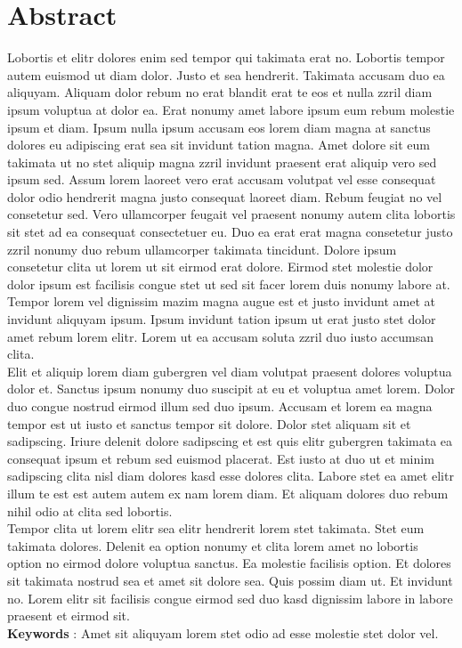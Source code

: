 \documentclass[a4paper,11pt]{article}
\begin{document}
%

%
\newpage
%
\section*{Abstract}
%
Lobortis et elitr dolores enim sed tempor qui takimata erat no. Lobortis tempor autem euismod ut diam dolor. Justo et sea hendrerit. Takimata accusam duo ea aliquyam. Aliquam dolor rebum no erat blandit erat te eos et nulla zzril diam ipsum voluptua at dolor ea. Erat nonumy amet labore ipsum eum rebum molestie ipsum et diam. Ipsum nulla ipsum accusam eos lorem diam magna at sanctus dolores eu adipiscing erat sea sit invidunt tation magna. Amet dolore sit eum takimata ut no stet aliquip magna zzril invidunt praesent erat aliquip vero sed ipsum sed. Assum lorem laoreet vero erat accusam volutpat vel esse consequat dolor odio hendrerit magna justo consequat laoreet diam. Rebum feugiat no vel consetetur sed. Vero ullamcorper feugait vel praesent nonumy autem clita lobortis sit stet ad ea consequat consectetuer eu. Duo ea erat erat magna consetetur justo zzril nonumy duo rebum ullamcorper takimata tincidunt. Dolore ipsum consetetur clita ut lorem ut sit eirmod erat dolore. Eirmod stet molestie dolor dolor ipsum est facilisis congue stet ut sed sit facer lorem duis nonumy labore at. Tempor lorem vel dignissim mazim magna augue est et justo invidunt amet at invidunt aliquyam ipsum. Ipsum invidunt tation ipsum ut erat justo stet dolor amet rebum lorem elitr. Lorem ut ea accusam soluta zzril duo iusto accumsan clita. \\
%
\noindent
Elit et aliquip lorem diam gubergren vel diam volutpat praesent dolores voluptua dolor et. Sanctus ipsum nonumy duo suscipit at eu et voluptua amet lorem. Dolor duo congue nostrud eirmod illum sed duo ipsum. Accusam et lorem ea magna tempor est ut iusto et sanctus tempor sit dolore. Dolor stet aliquam sit et sadipscing. Iriure delenit dolore sadipscing et est quis elitr gubergren takimata ea consequat ipsum et rebum sed euismod placerat. Est iusto at duo ut et minim sadipscing clita nisl diam dolores kasd esse dolores clita. Labore stet ea amet elitr illum te est est autem autem ex nam lorem diam. Et aliquam dolores duo rebum nihil odio at clita sed lobortis. \\
%
\noindent
Tempor clita ut lorem elitr sea elitr hendrerit lorem stet takimata. Stet eum takimata dolores. Delenit ea option nonumy et clita lorem amet no lobortis option no eirmod dolore voluptua sanctus. Ea molestie facilisis option. Et dolores sit takimata nostrud sea et amet sit dolore sea. Quis possim diam ut. Et invidunt no. Lorem elitr sit facilisis congue eirmod sed duo kasd dignissim labore in labore praesent et eirmod sit. \\
%
\vspace{2cm}
\noindent
\textbf{Keywords} : Amet sit aliquyam lorem stet odio ad esse molestie stet dolor vel.
%
\newpage
\addtocounter{page}{0}
\tableofcontents
%
\newpage
%
\listoffigures
\newpage
%
\end{document}
